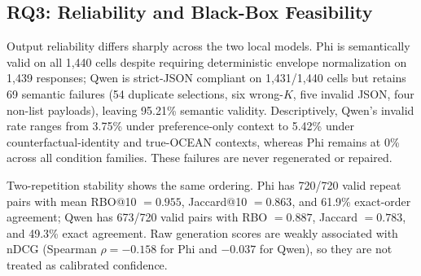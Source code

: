 \documentclass[runningheads]{llncs}
\begin{document}
\subsection{RQ3: Reliability and Black-Box Feasibility}
Output reliability differs sharply across the two local models. Phi is semantically valid on all 1,440 cells despite requiring deterministic envelope normalization on 1,439 responses; Qwen is strict-JSON compliant on 1,431/1,440 cells but retains 69 semantic failures (54 duplicate selections, six wrong-$K$, five invalid JSON, four non-list payloads), leaving 95.21\% semantic validity. Descriptively, Qwen's invalid rate ranges from 3.75\% under preference-only context to 5.42\% under counterfactual-identity and true-OCEAN contexts, whereas Phi remains at 0\% across all condition families. These failures are never regenerated or repaired.

Two-repetition stability shows the same ordering. Phi has 720/720 valid repeat pairs with mean RBO@10 $=0.955$, Jaccard@10 $=0.863$, and 61.9\% exact-order agreement; Qwen has 673/720 valid pairs with RBO $=0.887$, Jaccard $=0.783$, and 49.3\% exact agreement. Raw generation scores are weakly associated with nDCG (Spearman $\rho=-0.158$ for Phi and $-0.037$ for Qwen), so they are not treated as calibrated confidence.

\end{document}
